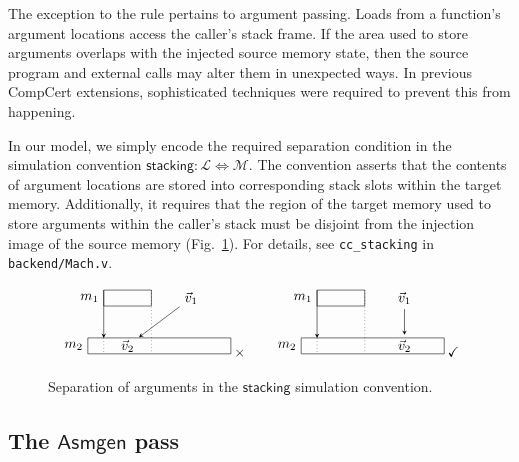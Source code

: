 \documentclass[11pt,oneside,draft]{book}
\theoremstyle{definition}
\newcommand{\kw}[1]{\ensuremath{ \mathsf{#1} }}
\begin{document}
The exception to the rule pertains to argument passing.
Loads from a function's argument locations
access the caller's stack frame.
If the area used to store arguments
overlaps with the injected source memory state,
then the source program and external calls
may alter them in unexpected ways.
In previous CompCert extensions,
sophisticated techniques were required
to prevent this from happening.

In our model,
we simply encode the required separation condition
in the simulation convention
$\kw{stacking} : \mathcal{L} \Leftrightarrow \mathcal{M}$.
The convention
asserts that the contents of argument locations
are stored into corresponding stack slots
within the target memory.
Additionally, it
requires that the region of the target memory
used to store arguments within the caller's stack
must be disjoint from the injection image of the source memory
(Fig.~\ref{fig:stacking}).
For details,
see \texttt{cc\_stacking} in \texttt{backend/Mach.v}.

\begin{figure}
\[
  \begin{tikzpicture}[scale=0.4,>=stealth]
    \draw ( 1,3) rectangle +(3,1); \node[left] at (1,3.5) {$m_1$};
    \draw ( 0,0) rectangle +(9,1); \node[left] at (0,0.5) {$m_2$};
    \node (V1) at (6.5,3.5) {$\vec{v}_1$};
    \node (V2) at (2.5,0.5) {$\vec{v}_2$};
    \draw[->] (1,4) -- (1,1); \draw[dotted] (1,1) -- (1,0); \draw[dotted] (4,4) -- (4,0);
    \draw[->] (V1) -- (V2);
  \end{tikzpicture}
  \:{\times}
  \qquad
  \begin{tikzpicture}[scale=0.4,>=stealth]
    \draw ( 1,3) rectangle +(3,1); \node[left] at (1,3.5) {$m_1$};
    \draw ( 0,0) rectangle +(9,1); \node[left] at (0,0.5) {$m_2$};
    \node (V1) at (6.5,3.5) {$\vec{v}_1$};
    \node (V2) at (6.5,0.5) {$\vec{v}_2$};
    \draw[->] (1,4) -- (1,1); \draw[dotted] (1,1) -- (1,0); \draw[dotted] (4,4) -- (4,0);
    \draw[->] (V1) -- (V2);
  \end{tikzpicture}
  \:{\checkmark}
\]
  \caption{Separation of arguments
    in the \kw{stacking} simulation convention.}
  \label{fig:stacking}
\end{figure}


\subsection{The \kw{Asmgen} pass} \label{sec:asmgen} %
\end{document}
